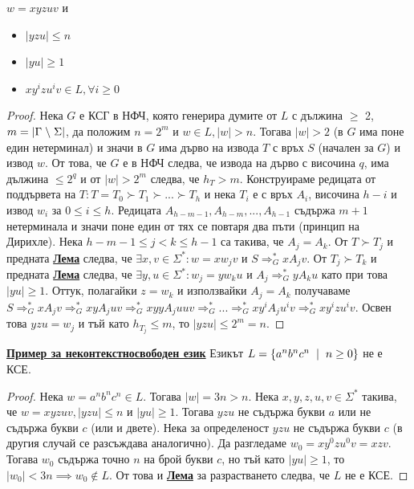\documentclass{article}
\begin{document}
$w = xyzuv$ и
\begin{itemize}
    \item $|yzu| \le n$
    \item $|yu| \ge 1$
    \item $xy^izu^iv \in L, \forall i \ge 0$
\end{itemize}
\begin{proof}
Нека $G$ е КСГ в НФЧ, която генерира думите от $L$ с дължина $\ge$ 2, $m = |\Gamma \hspace{0.1cm} \backslash \hspace{0.1cm} \Sigma|$, да положим $n = 2^m$ и
$w \in L, |w| > n$. Тогава $|w| > 2$ (в $G$ има поне един нетерминал) и значи в $G$ има дърво на извода $T$ с връх
$S$ (начален за $G$) и извод $w$. От това, че $G$ е в НФЧ следва, че извода на дърво с височина $q$, има дължина $\le 2^q$ и от $|w| > 2^m$ следва, че
$h_T > m$. \newline Конструираме редицата от поддървета на $T : T = T_0 \succ T_1 \succ ... \succ T_h$ и нека
$T_i$ е с връх $A_i$, височина $h - i$ и извод $w_i$ за $0 \leq i \leq h$. Редицата $A_{h-m-1}, A_{h-m}, ..., A_{h-1}$ съдържа
$m + 1$ нетерминала и значи поне един от тях се повтаря два пъти (принцип на Дирихле). \newline Нека $h - m - 1 \leq j < k \leq h - 1$ са такива, че $A_j = A_k$. \newline
От $T \succ T_j$ и предната \textbf{\underline{Лема}} следва, че $\exists x, v \in \Sigma^* : w = xw_jv$ и $S \Rightarrow^*_{G} xA_jv$. От $T_j \succ T_k$ и предната
\textbf{\underline{Лема}} следва, че $\exists y, u \in \Sigma^* : w_j = yw_ku$ и $A_j \Rightarrow^*_{G} yA_ku$ като при това $|yu| \ge 1$. Оттук, полагайки
$z = w_k$ и използвайки $A_j = A_k$ получаваме $S \Rightarrow^*_{G} xA_jv \Rightarrow^*_{G} xyA_juv \Rightarrow^*_{G} xyyA_juuv \Rightarrow^*_{G} ...
\Rightarrow^*_{G} xy^iA_ju^iv \Rightarrow^*_{G} xy^izu^iv$. Освен това $yzu = w_j$ и тъй като $h_{T_j} \le m$, то $|yzu| \le 2^m = n$.
\end{proof}
\textbf{\underline{Пример за неконтекстносвободен език}} \newline\newline
    Езикът $L = \{a^nb^nc^n \hspace{0.2cm} | \hspace{0.2cm} n \ge 0\}$ не е КСЕ.
    \begin{proof}
        Нека $w = a^nb^nc^n \in L$. Тогава $|w| = 3n > n$. Нека $x, y, z, u, v \in \Sigma^*$ такива, че $w = xyzuv, |yzu| \le n$ и
        $|yu| \ge 1$. Тогава $yzu$ не съдържа букви $a$ или не съдържа букви $c$ (или и двете). Нека за определеност $yzu$ не
        съдържа букви $c$ (в другия случай се разсъждава аналогично). Да разгледаме $w_0 = xy^0zu^0v = xzv$. Тогава $w_0$ съдържа
        точно $n$ на брой букви $c$, но тъй като $|yu| \ge 1$, то $|w_0| < 3n \implies w_0 \notin L$. От това и \textbf{\underline{Лема}}
        за разрастването следва, че $L$ не е КСЕ.
    \end{proof}
\end{document}
